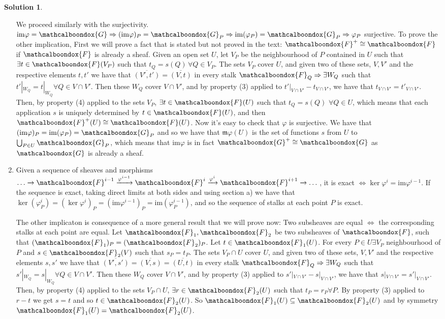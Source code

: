 \documentclass[12pt]{article}
\newcommand{\imp}{\ensuremath{\Rightarrow}}
\newcommand{\im}{\ensuremath{\mathfrak{m}}}
\newcommand{\ima}{\ensuremath{\mathrm{im}}}
\theoremstyle{definition}
\newtheorem*{sol}{Solution}
\newcommand{\sF}{\ensuremath{\mathcalboondox{F}}}
\newcommand{\sG}{\ensuremath{\mathcalboondox{G}}}
\begin{document}
\begin{sol}
\begin{enumerate}[label=\alph*)]
		We proceed similarly with the surjectivity. $\ima \varphi = \sG \imp (\ima \varphi)_P = \sG_P \imp \ima (\varphi_P) = \sG_P \imp \varphi_P$ surjective. To prove the other implication, First we will prove a fact that is stated but not proved in the text: $\sF^{+} \cong \sF$ if $\sF$ is already a sheaf. Given an open set $U$, let $V_P$ be the neighbourhood of $P$ contained in $U$ such that $\exists t \in \sF(V_P)$ such that $t_Q = s(Q) \, \forall Q \in V_P$. The sets $V_P$ cover $U$, and given two of these sets, $V,V'$ and the respective elements $t,t'$ we have that $\overline{(V',t')} = \overline{(V,t)}$ in every stalk $\sF_Q \imp \exists W_Q$ such that $t'|_{W_Q} = t|_{W_Q} \forall Q \in V \cap V'$. Then these $W_Q$ cover $V \cap V'$, and by property (3) applied to $t'|_{V\cap V'}-t_{V\cap V'}$, we have that $t_{V\cap V'} = t'_{V \cap V'}$. Then, by property (4) applied to the sets $V_P$, $\exists t \in \sF(U)$ such that $t_Q = s(Q) \, \, \forall Q \in U$, which means that each application $s$ is uniquely determined by $t \in \sF(U)$, and then $\sF^{+}(U) \cong \sF(U)$. Now it's easy to check that $\varphi$ is surjective. We have that $(\ima \varphi)_P = \ima (\varphi_P) = \sG_P$ and so we have that $\im \varphi (U)$ is the set of functions $s$ from $U$ to $\bigcup_{P \in U} \sG_P$, which means that $\ima \varphi$ is in fact $\sG^{+} \cong \sG$ as $\sG$ is already a sheaf.

		\item Given a sequence of sheaves and morphisms $\dots \xrightarrow[]{} \sF^{i-1} \xrightarrow[]{\varphi^{i-1}} \sF^{i} \xrightarrow[]{\varphi^{i}} \sF^{i+1} \xrightarrow[]{} \dots$, it is exact $\iff \ker \varphi^{i} = \ima \varphi^{i-1}$. If the sequence is exact, taking direct limits at both sides and using section a) we have that $\ker (\varphi^{i}_P) = (\ker \varphi^{i})_P = (\ima \varphi^{i-1})_P = \ima (\varphi^{i-1}_P) $, and so the sequence of stalks at each point $P$ is exact.

		The other implicaton is consequence of a more general result that we will prove now: Two subsheaves are equal $\iff$ the corresponding stalks at each point are equal. Let $\sF_1, \sF_2$ be two subsheaves of $\sF$, such that $(\sF_1)_P = (\sF_2)_P$. Let $t \in \sF_1(U)$. For every $P \in U \exists V_P$ neighbourhood of $P$ and $s \in \sF_2(V)$ such that $s_P = t_P$. The sets $V_P \cap U$ cover $U$, and given two of these sets, $V,V'$ and the respective elements $s,s'$ we have that $\overline{(V',s')} = \overline{(V,s)} = \overline{(U,t)}$ in every stalk $\sF_Q \imp \exists W_Q$ such that $s'|_{W_Q} = s|_{W_Q} \forall Q \in V \cap V'$. Then these $W_Q$ cover $V \cap V'$, and by property (3) applied to $s'|_{V\cap V'}-s|_{V\cap V'}$, we have that $s|_{V\cap V'} = s'|_{V \cap V'}$. Then, by property (4) applied to the sets $V_P \cap U$, $\exists r \in \sF_2(U)$ such that $t_P = r_P \forall P$. By property (3) applied to $r-t$ we get $s = t$ and so $t \in \sF_2(U)$. So $\sF_1(U) \subseteq \sF_2(U)$ and by symmetry $\sF_1(U) = \sF_2(U)$.
	\end{enumerate}
\end{sol}
\end{document}
